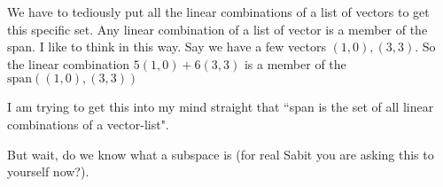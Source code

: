 \documentclass[letter]{article}
\begin{document}

We have to tediously put all the linear combinations of a list of vectors to get this specific set. Any linear combination of a list of vector is a member of the span. I like to think in this way. Say we have a few vectors $(1,0), (3,3)$. So the linear combination $5(1,0) + 6(3,3)$ is a member of the $\text{span}((1,0),(3,3))$ 

I am trying to get this into my mind straight that ``span is the set of all linear combinations of a vector-list".


But wait, do we know what a subspace is (for real Sabit you are asking this to yourself now?). 
\end{document}
